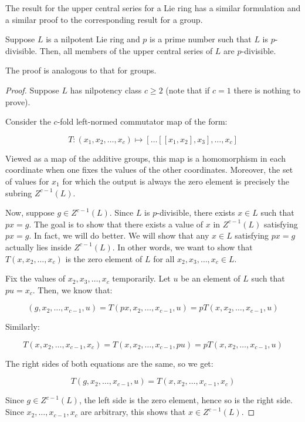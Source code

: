 The result for the upper central series for a Lie ring has a similar
formulation and a similar proof to the corresponding result for a
group.

\begin{theorem}\label{thm:divisibility-upper-central-series-lie}
  Suppose $L$ is a nilpotent Lie ring and $p$ is a prime number such that
  $L$ is $p$-divisible. Then, all members of the upper central series
  of $L$ are $p$-divisible.
\end{theorem}

The proof is analogous to that for groups.

\begin{proof}
  Suppose $L$ has nilpotency class $c \ge 2$ (note that if $c = 1$
  there is nothing to prove).

  Consider the $c$-fold left-normed commutator map of the form:

  $$T:(x_1,x_2,\dots,x_c) \mapsto [\dots [[x_1,x_2],x_3],\dots,x_c]$$

  Viewed as a map of the additive groups, this map is a homomorphism
  in each coordinate when one fixes the values of the other
  coordinates. Moreover, the set of values for $x_1$ for which the
  output is always the zero element is precisely the subring
  $Z^{c-1}(L)$.

  Now, suppose $g \in Z^{c-1}(L)$. Since $L$ is $p$-divisible, there
  exists $x \in L$ such that $px = g$. The goal is to show that there
  exists a value of $x$ in $Z^{c-1}(L)$ satisfying $px = g$. In
  fact, we will do better. We will show that any $x \in L$ satisfying
  $px = g$ actually lies inside $Z^{c-1}(L)$. In other words, we want
  to show that $T(x,x_2,\dots,x_c)$ is the zero element of $L$ for
  all $x_2,x_3,\dots,x_c \in L$.

  Fix the values of $x_2,x_3,\dots,x_c$ temporarily. Let $u$ be an
  element of $L$ such that $pu = x_c$. Then, we know that:

  $$(g,x_2,\dots,x_{c-1},u) = T(px,x_2,\dots,x_{c-1},u) = pT(x,x_2,\dots,x_{c-1},u)$$

  Similarly:

  $$T(x,x_2,\dots,x_{c-1},x_c) = T(x,x_2,\dots,x_{c-1},pu) = pT(x,x_2,\dots,x_{c-1},u)$$

  The right sides of both equations are the same, so we get:

  $$T(g,x_2,\dots,x_{c-1},u) = T(x,x_2,\dots,x_{c-1},x_c)$$

  Since $g \in Z^{c-1}(L)$, the left side is the zero element,
  hence so is the right side. Since $x_2,\dots,x_{c-1},x_c$ are
  arbitrary, this shows that $x \in Z^{c-1}(L)$.


\end{proof}
